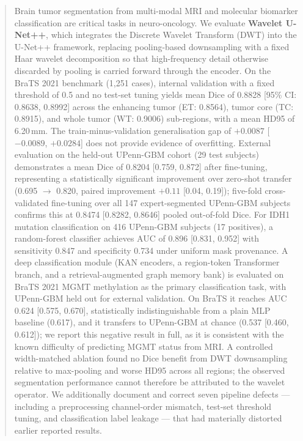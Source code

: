 \documentclass[conference]{IEEEtran}
\begin{document}
\begin{abstract}
Brain tumor segmentation from multi-modal MRI and molecular biomarker classification are critical tasks in neuro-oncology. We evaluate \textbf{Wavelet U-Net++}, which integrates the Discrete Wavelet Transform (DWT) into the U-Net++ framework, replacing pooling-based downsampling with a fixed Haar wavelet decomposition so that high-frequency detail otherwise discarded by pooling is carried forward through the encoder. On the BraTS 2021 benchmark (1,251 cases), internal validation with a fixed threshold of 0.5 and no test-set tuning yields mean Dice of 0.8828 [95\% CI: 0.8638, 0.8992] across the enhancing tumor (ET: 0.8564), tumor core (TC: 0.8915), and whole tumor (WT: 0.9006) sub-regions, with a mean HD95 of 6.20\,mm. The train-minus-validation generalisation gap of $+0.0087$ [$-0.0089$, $+0.0284$] does not provide evidence of overfitting. External evaluation on the held-out UPenn-GBM cohort (29 test subjects) demonstrates a mean Dice of 0.8204 [0.759, 0.872] after fine-tuning, representing a statistically significant improvement over zero-shot transfer (0.695 $\to$ 0.820, paired improvement $+0.11$ [0.04, 0.19]); five-fold cross-validated fine-tuning over all 147 expert-segmented UPenn-GBM subjects confirms this at 0.8474 [0.8282, 0.8646] pooled out-of-fold Dice. For IDH1 mutation classification on 416 UPenn-GBM subjects (17 positives), a random-forest classifier achieves AUC of 0.896 [0.831, 0.952] with sensitivity 0.847 and specificity 0.734 under uniform mask provenance. A deep classification module (KAN encoders, a region-token Transformer branch, and a retrieval-augmented graph memory bank) is evaluated on BraTS 2021 MGMT methylation as the primary classification task, with UPenn-GBM held out for external validation. On BraTS it reaches AUC 0.624 [0.575, 0.670], statistically indistinguishable from a plain MLP baseline (0.617), and it transfers to UPenn-GBM at chance (0.537 [0.460, 0.612]); we report this negative result in full, as it is consistent with the known difficulty of predicting MGMT status from MRI. A controlled width-matched ablation found no Dice benefit from DWT downsampling relative to max-pooling and worse HD95 across all regions; the observed segmentation performance cannot therefore be attributed to the wavelet operator. We additionally document and correct seven pipeline defects --- including a preprocessing channel-order mismatch, test-set threshold tuning, and classification label leakage --- that had materially distorted earlier reported results.
\end{abstract}
\end{document}
